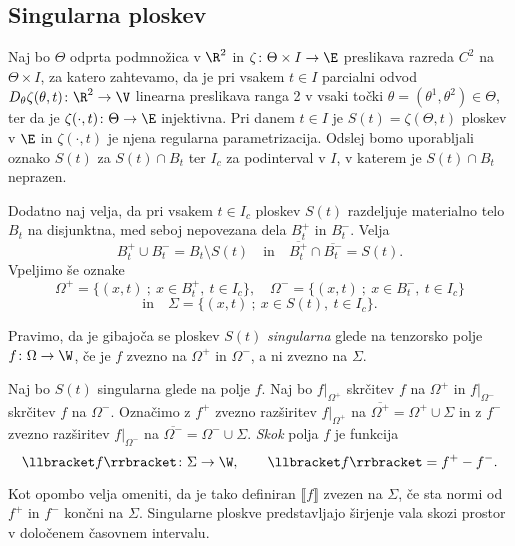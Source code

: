 \subsection{Singularna ploskev}


Naj bo $\Theta$ odprta podmnožica v $\R^2$ in $\zeta\colon\Theta\times I\to\E$ preslikava
razreda $C^2$ na $\Theta\times I$, za katero zahtevamo, da je pri vsakem $t\in I$ parcialni
odvod $D_{\theta}\zeta(\theta,t)\colon\R^2\to\V$ linearna preslikava ranga 2
v vsaki točki $\theta=(\theta^1,\theta^2)\in\Theta$, ter da je $\zeta(\cdot,t)\colon\Theta\to\E$
injektivna. Pri danem $t\in I$ je $S(t)=\zeta(\Theta, t)$ ploskev
v $\E$ in $\zeta(\cdot, t)$ je njena regularna parametrizacija. Odslej bomo uporabljali
oznako $S(t)$ za $S(t)\cap B_t$ ter $I_c$ za podinterval v $I$, v katerem je $S(t)\cap B_t$ neprazen.

Dodatno naj velja, da pri vsakem $t\in I_c$ ploskev $S(t)$ razdeljuje materialno telo $B_t$
na disjunktna, med seboj nepovezana dela $B_t^+$ in $B_t^-$. Velja
\[ B_t^+\cup B_t^- = B_t\setminus S(t)\quad\mathrm{in}\quad \overline{B_t^+}\cap \overline{B_t^-}=S(t). \]
Vpeljimo še oznake
\[ \Omega^+=\{(x, t)\: ; \: x\in B_t^+,\ t\in I_c\},\quad\Omega^-=\{(x, t)\: ; \: x\in B_t^-,\ t\in I_c\} \]
\begin{equation*} \textrm{in}\quad\Sigma = \{(x, t)\: ; \: x\in S(t),\ t\in I_c\}. \end{equation*}

\begin{definicija}
	Pravimo, da je gibajoča se ploskev $S(t)$ \emph{singularna} glede na tenzorsko polje
	$f\colon\Omega\to\W$, če je $f$ zvezno na $\Omega^+$ in $\Omega^-$, a ni zvezno na $\Sigma$.
\end{definicija}
\begin{definicija}
	Naj bo $S(t)$ singularna glede na polje $f$. Naj bo $f|_{\Omega^+}$
	skrčitev $f$ na $\Omega^+$ in $f|_{\Omega^-}$ skrčitev $f$ na $\Omega^-$. Označimo z
	$f^+$ zvezno razširitev $f|_{\Omega^+}$ na $\overline{\Omega^+}=\Omega^+\cup\Sigma$ in z
	$f^-$ zvezno razširitev $f|_{\Omega^-}$ na $\overline{\Omega^-}=\Omega^-\cup\Sigma$. \emph{Skok} polja $f$
	je funkcija
	\[ \llbracket f\rrbracket\colon\Sigma\to\W,\qquad \llbracket f\rrbracket=f^+-f^-. \]
\end{definicija}
Kot opombo velja omeniti, da je tako definiran $\llbracket f\rrbracket$ zvezen na $\Sigma$,
če sta normi od $f^+$ in $f^-$ končni na $\Sigma$.
Singularne ploskve predstavljajo širjenje vala skozi prostor v določenem časovnem intervalu.

